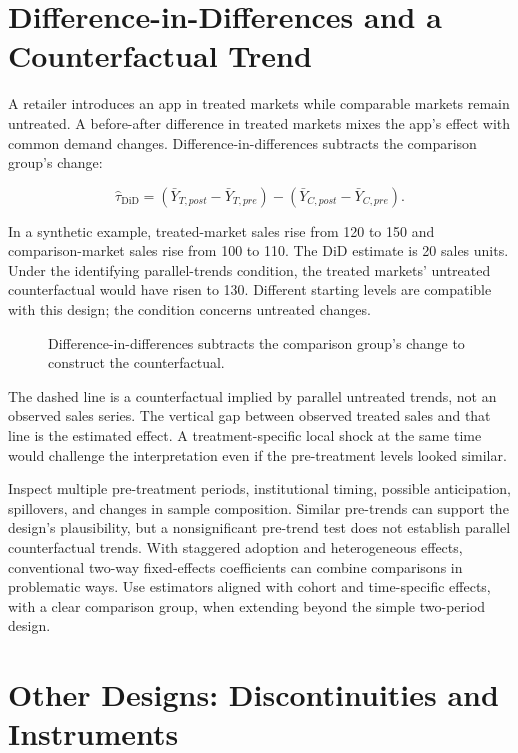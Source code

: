 \hypertarget{M06-difference-in-differences-and-a-counterfactual-trend}{%
\section{Difference-in-Differences and a Counterfactual
Trend}\label{M06-difference-in-differences-and-a-counterfactual-trend}}

\noindent A retailer introduces an app in treated markets while comparable markets
remain untreated. A before-after difference in treated markets mixes the
app's effect with common demand changes. Difference-in-differences
subtracts the comparison group's change:

\[
\hat\tau_{\mathrm{DiD}}=(\bar Y_{T,post}-\bar Y_{T,pre})-(\bar Y_{C,post}-\bar Y_{C,pre}).
\]

In a synthetic example, treated-market sales rise from 120 to 150 and
comparison-market sales rise from 100 to 110. The DiD estimate is 20
sales units. Under the identifying parallel-trends condition, the
treated markets' untreated counterfactual would have risen to 130.
Different starting levels are compatible with this design; the condition
concerns untreated changes.

\begin{figure}[htbp]
\centering

\caption{Difference-in-differences subtracts the comparison group’s change to construct the counterfactual.}\label{fig:M06_did}
\end{figure}

The dashed line is a counterfactual implied by parallel untreated
trends, not an observed sales series. The vertical gap between observed
treated sales and that line is the estimated effect. A
treatment-specific local shock at the same time would challenge the
interpretation even if the pre-treatment levels looked similar.

Inspect multiple pre-treatment periods, institutional timing, possible
anticipation, spillovers, and changes in sample composition. Similar
pre-trends can support the design's plausibility, but a nonsignificant
pre-trend test does not establish parallel counterfactual trends. With
staggered adoption and heterogeneous effects, conventional two-way
fixed-effects coefficients can combine comparisons in problematic ways.
Use estimators aligned with cohort and time-specific effects, with a
clear comparison group, when extending beyond the simple two-period
design.

\hypertarget{M06-other-designs-discontinuities-and-instruments}{%
\section{Other Designs: Discontinuities and
Instruments}\label{M06-other-designs-discontinuities-and-instruments}}

